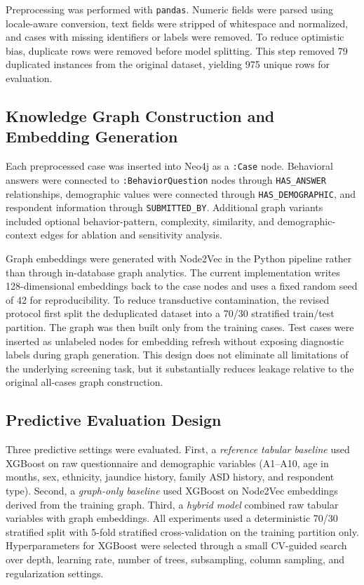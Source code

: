 Preprocessing was performed with \texttt{pandas}. Numeric fields were parsed using locale-aware conversion, text fields were stripped of whitespace and normalized, and cases with missing identifiers or labels were removed. To reduce optimistic bias, duplicate rows were removed before model splitting. This step removed 79 duplicated instances from the original dataset, yielding 975 unique rows for evaluation.

\subsection{Knowledge Graph Construction and Embedding Generation}

Each preprocessed case was inserted into Neo4j as a \texttt{:Case} node. Behavioral answers were connected to \texttt{:BehaviorQuestion} nodes through \texttt{HAS\_ANSWER} relationships, demographic values were connected through \texttt{HAS\_DEMOGRAPHIC}, and respondent information through \texttt{SUBMITTED\_BY}. Additional graph variants included optional behavior-pattern, complexity, similarity, and demographic-context edges for ablation and sensitivity analysis.

Graph embeddings were generated with Node2Vec in the Python pipeline rather than through in-database graph analytics. The current implementation writes 128-dimensional embeddings back to the case nodes and uses a fixed random seed of 42 for reproducibility. To reduce transductive contamination, the revised protocol first split the deduplicated dataset into a 70/30 stratified train/test partition. The graph was then built only from the training cases. Test cases were inserted as unlabeled nodes for embedding refresh without exposing diagnostic labels during graph generation. This design does not eliminate all limitations of the underlying screening task, but it substantially reduces leakage relative to the original all-cases graph construction.

\subsection{Predictive Evaluation Design}

Three predictive settings were evaluated. First, a \textit{reference tabular baseline} used XGBoost on raw questionnaire and demographic variables (A1--A10, age in months, sex, ethnicity, jaundice history, family ASD history, and respondent type). Second, a \textit{graph-only baseline} used XGBoost on Node2Vec embeddings derived from the training graph. Third, a \textit{hybrid model} combined raw tabular variables with graph embeddings. All experiments used a deterministic 70/30 stratified split with 5-fold stratified cross-validation on the training partition only. Hyperparameters for XGBoost were selected through a small CV-guided search over depth, learning rate, number of trees, subsampling, column sampling, and regularization settings.

